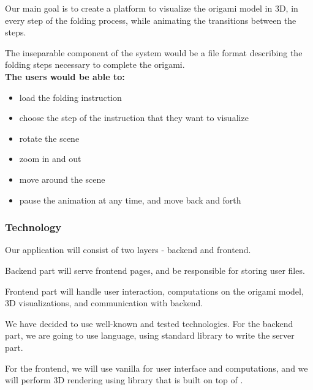 Our main goal is to create a platform to visualize the origami model in 3D,
in every step of the folding process, while animating the transitions between the steps.

The inseparable component of the system would be a file format describing the folding steps necessary to complete the origami.\\

\noindent \textbf{The users would be able to:}
\begin{itemize}
	\item load the folding instruction
	\item choose the step of the instruction that they want to visualize
	\item rotate the scene
    \item zoom in and out
	\item move around the scene
	\item pause the animation at any time, and move back and forth
\end{itemize}

\subsubsection{Technology}

Our application will consist of two layers - backend and frontend.

Backend part will serve frontend pages, and be responsible
for storing user files.

Frontend part will handle user interaction, computations on the origami model,
3D visualizations, and communication with backend.

We have decided to use well-known and tested technologies.
For the backend part, we are going to use  language,
using standard library to write the server part.

For the frontend, we will use vanilla 
for user interface and computations,
and we will perform 3D rendering using  library
that is built on top of .

